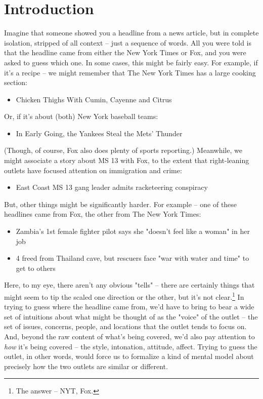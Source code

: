 \documentclass{scrartcl}
\begin{document}
\section{Introduction}

Imagine that someone showed you a headline from a news article, but in complete isolation, stripped of all context -- just a sequence of words. All you were told is that the headline came from either the New York Times or Fox, and you were asked to guess which one. In some cases, this might be fairly easy. For example, if it's a recipe -- we might remember that The New York Times has a large cooking section:

\begin{itemize}
  \item Chicken Thighs With Cumin, Cayenne and Citrus
\end{itemize}

Or, if it's about (both) New York baseball teams:

\begin{itemize}
  \item In Early Going, the Yankees Steal the Mets' Thunder
\end{itemize}

(Though, of course, Fox also does plenty of sports reporting.) Meanwhile, we might associate a story about MS 13 with Fox, to the extent that right-leaning outlets have focused attention on immigration and crime:

\begin{itemize}
  \item East Coast MS 13 gang leader admits racketeering conspiracy
\end{itemize}

But, other things might be significantly harder. For example -- one of these headlines came from Fox, the other from The New York Times:

\begin{itemize}
  \item Zambia's 1st female fighter pilot says she "doesn't feel like a woman" in her job
  \item 4 freed from Thailand cave, but rescuers face "war with water and time" to get to others
\end{itemize}

Here, to my eye, there aren't any obvious "tells" -- there are certainly things that might seem to tip the scaled one direction or the other, but it's not clear.\footnote{The answer -- NYT, Fox.} In trying to guess where the headline came from, we'd have to bring to bear a wide set of intuitions about what might be thought of as the "voice" of the outlet -- the set of issues, concerns, people, and locations that the outlet tends to focus on. And, beyond the raw content of what's being covered, we'd also pay attention to \textit{how} it's being covered -- the style, intonation, attitude, affect. Trying to guess the outlet, in other words, would force us to formalize a kind of mental model about precisely how the two outlets are similar or different.
\end{document}

